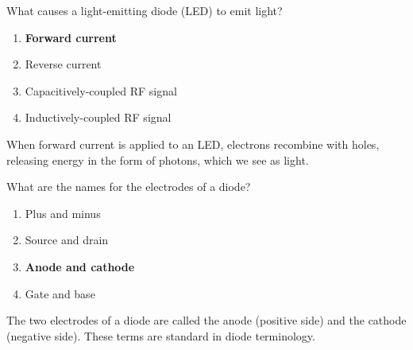 \begin{tcolorbox}[colback=gray!10!white,colframe=black!75!black,title={T6B07}]
    What causes a light-emitting diode (LED) to emit light?
    \begin{enumerate}[label=\Alph*),noitemsep]
        \item \textbf{Forward current}
        \item Reverse current
        \item Capacitively-coupled RF signal
        \item Inductively-coupled RF signal
    \end{enumerate}
\end{tcolorbox}
When forward current is applied to an LED, electrons recombine with holes, releasing energy in the form of photons, which we see as light.

\begin{tcolorbox}[colback=gray!10!white,colframe=black!75!black,title={T6B09}]
    What are the names for the electrodes of a diode?
    \begin{enumerate}[label=\Alph*),noitemsep]
        \item Plus and minus
        \item Source and drain
        \item \textbf{Anode and cathode}
        \item Gate and base
    \end{enumerate}
\end{tcolorbox}
The two electrodes of a diode are called the anode (positive side) and the cathode (negative side). These terms are standard in diode terminology.
